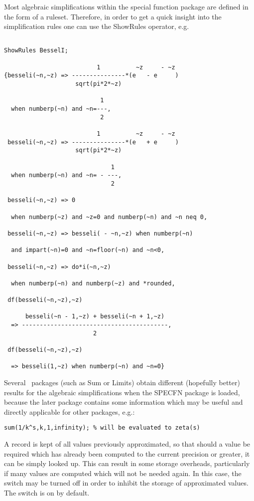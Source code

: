 Most algebraic simplifications within the special function package 
are defined in the form of a \REDUCE{} ruleset. Therefore, in order to
get a quick insight into the simplification rules one can use the
ShowRules operator, e.g.
\begin{verbatim}

ShowRules BesselI;

                          1          ~z     - ~z
{besseli(~n,~z) => ---------------*(e   - e     )
                    sqrt(pi*2*~z)

                           1
  when numberp(~n) and ~n=---,
                           2

                          1          ~z     - ~z
 besseli(~n,~z) => ---------------*(e   + e     )
                    sqrt(pi*2*~z)

                              1
  when numberp(~n) and ~n= - ---,
                              2

 besseli(~n,~z) => 0

  when numberp(~z) and ~z=0 and numberp(~n) and ~n neq 0,

 besseli(~n,~z) => besseli( - ~n,~z) when numberp(~n)

  and impart(~n)=0 and ~n=floor(~n) and ~n<0,

 besseli(~n,~z) => do*i(~n,~z)

  when numberp(~n) and numberp(~z) and *rounded,

 df(besseli(~n,~z),~z)

      besseli(~n - 1,~z) + besseli(~n + 1,~z)
  => -----------------------------------------,
                         2

 df(besseli(~n,~z),~z)

  => besseli(1,~z) when numberp(~n) and ~n=0}

\end{verbatim}
Several \REDUCE\ packages (such as Sum or Limits) obtain different
(hopefully better)
results for the algebraic simplifications when the SPECFN package 
is loaded, because the later package contains some information which
may be useful and directly applicable for other packages, e.g.:

\begin{verbatim}
sum(1/k^s,k,1,infinity); % will be evaluated to zeta(s)
\end{verbatim}

A record is kept of all values previously approximated, so that should a
value be required which has already been computed to the current
precision or greater, it can be simply looked up.  This can result in
some storage overheads, particularly if many values are computed which
will not be needed again.  In this case, the switch  may be
turned off in order to inhibit the storage of approximated values.  The
switch is on by default.


